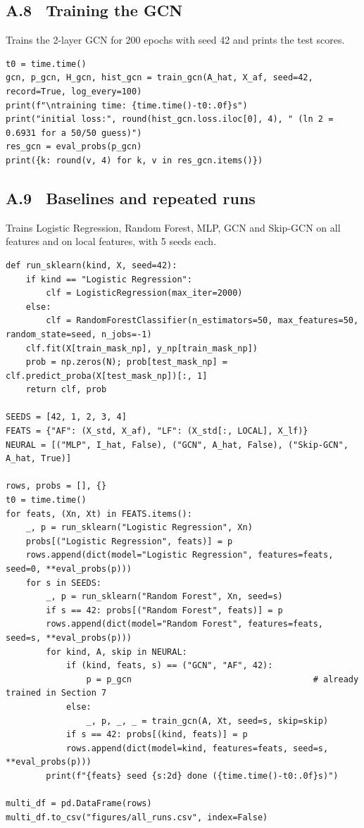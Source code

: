 \subsection*{A.8 \ Training the GCN}
Trains the 2-layer GCN for 200 epochs with seed 42 and prints the test scores.
\begin{lstlisting}
t0 = time.time()
gcn, p_gcn, H_gcn, hist_gcn = train_gcn(A_hat, X_af, seed=42, record=True, log_every=100)
print(f"\ntraining time: {time.time()-t0:.0f}s")
print("initial loss:", round(hist_gcn.loss.iloc[0], 4), " (ln 2 = 0.6931 for a 50/50 guess)")
res_gcn = eval_probs(p_gcn)
print({k: round(v, 4) for k, v in res_gcn.items()})
\end{lstlisting}

\subsection*{A.9 \ Baselines and repeated runs}
Trains Logistic Regression, Random Forest, MLP, GCN and Skip-GCN on all features and on local features, with 5 seeds each.
\begin{lstlisting}
def run_sklearn(kind, X, seed=42):
    if kind == "Logistic Regression":
        clf = LogisticRegression(max_iter=2000)
    else:
        clf = RandomForestClassifier(n_estimators=50, max_features=50, random_state=seed, n_jobs=-1)
    clf.fit(X[train_mask_np], y_np[train_mask_np])
    prob = np.zeros(N); prob[test_mask_np] = clf.predict_proba(X[test_mask_np])[:, 1]
    return clf, prob

SEEDS = [42, 1, 2, 3, 4]
FEATS = {"AF": (X_std, X_af), "LF": (X_std[:, LOCAL], X_lf)}
NEURAL = [("MLP", I_hat, False), ("GCN", A_hat, False), ("Skip-GCN", A_hat, True)]

rows, probs = [], {}
t0 = time.time()
for feats, (Xn, Xt) in FEATS.items():
    _, p = run_sklearn("Logistic Regression", Xn)
    probs[("Logistic Regression", feats)] = p
    rows.append(dict(model="Logistic Regression", features=feats, seed=0, **eval_probs(p)))
    for s in SEEDS:
        _, p = run_sklearn("Random Forest", Xn, seed=s)
        if s == 42: probs[("Random Forest", feats)] = p
        rows.append(dict(model="Random Forest", features=feats, seed=s, **eval_probs(p)))
        for kind, A, skip in NEURAL:
            if (kind, feats, s) == ("GCN", "AF", 42):
                p = p_gcn                                    # already trained in Section 7
            else:
                _, p, _, _ = train_gcn(A, Xt, seed=s, skip=skip)
            if s == 42: probs[(kind, feats)] = p
            rows.append(dict(model=kind, features=feats, seed=s, **eval_probs(p)))
        print(f"{feats} seed {s:2d} done ({time.time()-t0:.0f}s)")

multi_df = pd.DataFrame(rows)
multi_df.to_csv("figures/all_runs.csv", index=False)
\end{lstlisting}
